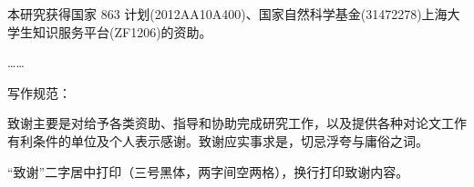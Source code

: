 
\begin{acknowledgements}

\vspace{1em}

本研究获得国家 863 计划(2012AA10A400)、国家自然科学基金(31472278)上海大学生知识服务平台(ZF1206)的资助。

……

写作规范：

致谢主要是对给予各类资助、指导和协助完成研究工作，以及提供各种对论文工作有利条件的单位及个人表示感谢。致谢应实事求是，切忌浮夸与庸俗之词。

“致谢”二字居中打印（三号黑体，两字间空两格），换行打印致谢内容。


\end{acknowledgements}
